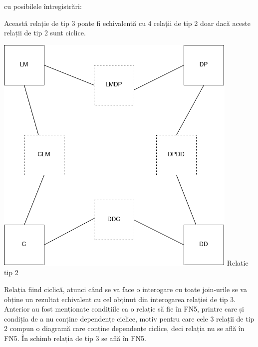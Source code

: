 \documentclass[12pt, a4paper]{article}
\begin{document}
\justifying 
cu posibilele întregistrări:

\begin{table}[!htbp]
\begin{center}
    \caption{Relația \emph{transport}}\label{tab15}
\end{center}
\end{table}

Această relație de tip 3 poate fi echivalentă cu 4 relații de tip 2 doar dacă aceste relații de tip 2 sunt ciclice.

\includegraphics[width=\textwidth]{fn5_rel_2.png}
\label{rel2}
\centering Relatie tip 2

\justifying Relația fiind ciclică, atunci când se va face o interogare cu toate join-urile se va obține un rezultat echivalent cu cel obținut din interogarea relației de tip 3. Anterior au fost menționate condițiile ca o relație să fie în FN5, printre care și condiția de a nu conține dependențe ciclice, motiv pentru care cele 3 relații de tip 2 compun o diagramă care conține dependențe ciclice, deci relația nu se află în FN5. În schimb relația de tip 3 se află în FN5.
\end{document}
